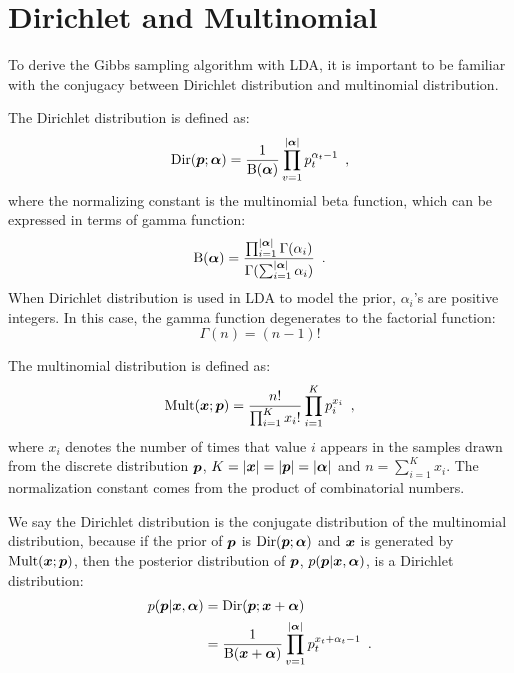 \section{Dirichlet and Multinomial}

To derive the Gibbs sampling algorithm with LDA, it is important to be
familiar with the conjugacy between Dirichlet distribution and
multinomial distribution.

The Dirichlet distribution is defined as:
\begin{equation}
  \label{eq:dirichlet-distribution}
  \operatorname{Dir}(\boldsymbol{p} ; \boldsymbol{\alpha})
  =
  \frac{1}{\operatorname{B}(\boldsymbol{\alpha})}
  \prod_{v=1}^{|\boldsymbol{\alpha}|} p_t^{\alpha_t-1}
  \enspace,
\end{equation}
where the normalizing constant is the multinomial beta function, which
can be expressed in terms of gamma function:
\begin{equation}
  \label{eq:beta-function}
  \operatorname{B}(\boldsymbol{\alpha})
  =
  \frac{
    \prod_{i=1}^{|\boldsymbol{\alpha}|} \Gamma(\alpha_i)
  }{
    \Gamma( \sum_{i=1}^{|\boldsymbol{\alpha}|} \alpha_i )
  }
  \enspace.
\end{equation}
When Dirichlet distribution is used in LDA to model the prior,
$\alpha_i$'s are positive integers.  In this case, the gamma function
degenerates to the factorial function:
\begin{equation}
  \label{eq:gamma-function}
  \Gamma(n) = (n-1)!
\end{equation}

The multinomial distribution is defined as:
\begin{equation}
  \label{eq:multinomial-distribution}
  \operatorname{Mult}(\boldsymbol{x} ; \boldsymbol{p})
  =
  \frac{n!}{\prod_{i=1}^K x_i!} \prod_{i=1}^K p_i^{x_i}
  \enspace,
\end{equation}
where $x_i$ denotes the number of times that value $i$ appears in the
samples drawn from the discrete distribution $\boldsymbol{p}$,
$K=|\boldsymbol{x}|=|\boldsymbol{p}|=|\boldsymbol{\alpha}|$ and $n=\sum_{i=1}^K{x_i}$.  The
normalization constant comes from the product of combinatorial
numbers.

We say the Dirichlet distribution is the conjugate distribution of the
multinomial distribution, because if the prior of $\boldsymbol{p}$ is
$\operatorname{Dir}(\boldsymbol{p};\boldsymbol{\alpha})$ and $\boldsymbol{x}$ is generated by
$\operatorname{Mult}(\boldsymbol{x};\boldsymbol{p})$, then the posterior distribution of $\boldsymbol{p}$,
$p(\boldsymbol{p}|\boldsymbol{x},\boldsymbol{\alpha})$, is a Dirichlet distribution:
\begin{equation}
  \begin{split}
  \label{eq:posterior-dirichlet}
  p(\boldsymbol{p}|\boldsymbol{x},\boldsymbol{\alpha})
  &=
  \operatorname{Dir}(\boldsymbol{p};\boldsymbol{x}+\boldsymbol{\alpha})
  \\
  &=
  \frac{1}{\operatorname{B}(\boldsymbol{x}+\boldsymbol{\alpha})}
  \prod_{v=1}^{|\boldsymbol{\alpha}|} p_t^{x_t+\alpha_t-1}
  \enspace.
\end{split}
\end{equation}

